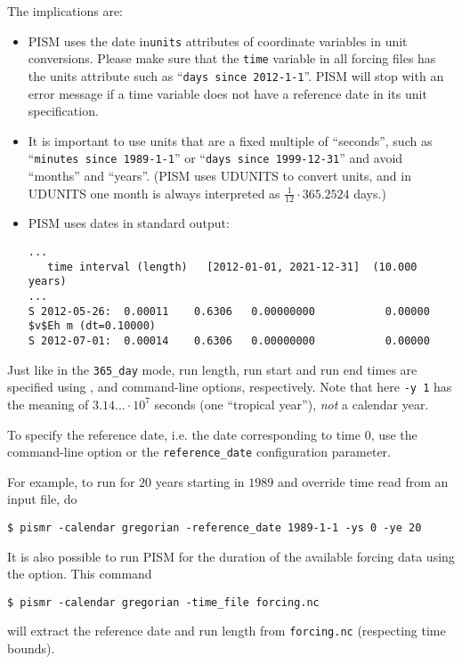 \documentclass[titlepage,letterpaper,final]{scrartcl}
\begin{document}
The implications are:
\begin{itemize}
\item PISM uses the date in\texttt{units} attributes of coordinate variables in
  unit conversions. Please make sure that the \texttt{time} variable in all
  forcing files has the units attribute such as ``\texttt{days since
    2012-1-1}''. PISM will stop with an error message if a time variable does
  not have a reference date in its unit specification.

\item It is important to use units that are a fixed multiple of ``seconds'',
  such as ``\texttt{minutes since 1989-1-1}'' or ``\texttt{days since
    1999-12-31}'' and avoid ``months'' and ``years''. (PISM uses UDUNITS to
  convert units, and in UDUNITS one month is always interpreted as
  $\frac{1}{12}\cdot 365.2524$ days.)
\item PISM uses dates in standard output:
\begin{verbatim}
...
   time interval (length)   [2012-01-01, 2021-12-31]  (10.000 years)
...
S 2012-05-26:  0.00011    0.6306   0.00000000           0.00000
$v$Eh m (dt=0.10000)
S 2012-07-01:  0.00014    0.6306   0.00000000           0.00000
\end{verbatim}
\end{itemize}

Just like in the \texttt{365_day} mode, run length, run start and run end times
are specified using ,  and 
command-line options, respectively. Note that here \texttt{-y 1} has the
meaning of $3.14...\cdot 10^{7}$ seconds (one ``tropical year''), \emph{not} a
calendar year.

To specify the reference date, i.e. the date corresponding to time $0$, use the
 command-line option or the
\texttt{reference_date} configuration parameter.

For example, to run for $20$ years starting in $1989$ and override time read
from an input file, do
\begin{verbatim}
$ pismr -calendar gregorian -reference_date 1989-1-1 -ys 0 -ye 20
\end{verbatim}

It is also possible to run PISM for the duration of the available forcing data using the  option.
This command
\begin{verbatim}
$ pismr -calendar gregorian -time_file forcing.nc
\end{verbatim}
will extract the reference date and run length from \texttt{forcing.nc} (respecting time bounds).
\end{document}
